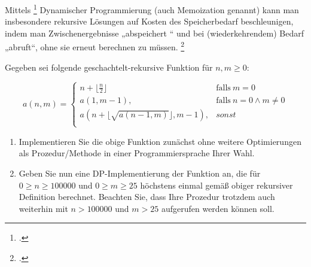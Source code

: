\documentclass{bschlangaul-aufgabe}
\begin{document}

Mittels \footcite[Thema 2 Aufgabe
4]{examen:46115:2016:09} Dynamischer Programmierung (auch Memoization
genannt) kann man insbesondere rekursive Lösungen auf Kosten des
Speicherbedarf beschleunigen, indem man Zwischenergebnisse „abspeichert
“ und bei (wiederkehrendem) Bedarf „abruft“, ohne sie erneut berechnen
zu müssen.
\footcite[Aufgabe 7]{aud:pu:7}

\bigskip

\noindent
Gegeben sei folgende geschachtelt-rekursive Funktion für $n, m \geq 0$:

\begin{equation*}
a(n, m) =
\begin{cases}
n + \lfloor \frac{n}{2} \rfloor &
\text{falls}\ m = 0\\

a(1, m-1), &
\text{falls}\ n = 0 \land m \neq 0 \\

a(n + \lfloor \sqrt{a(n-1,m)} \rfloor, m - 1), &
sonst \\
\end{cases}
\end{equation*}

\begin{enumerate}
\item Implementieren Sie die obige Funktion  zunächst ohne
weitere Optimierungen als Prozedur/Methode in einer Programmiersprache
Ihrer Wahl.

\begin{bAntwort}
\end{bAntwort}

\item Geben Sie nun eine DP-Implementierung der Funktion 
an, die  für $0 \geq n \geq 100000$ und $0 \geq m \geq 25$
höchstens einmal gemäß obiger rekursiver Definition berechnet. Beachten
Sie, dass Ihre Prozedur trotzdem auch weiterhin mit $n > 100000$ und $m
> 25$ aufgerufen werden können soll.

\begin{bAntwort}
\end{bAntwort}
\end{enumerate}

\begin{bAntwort}
\end{bAntwort}
\end{document}
